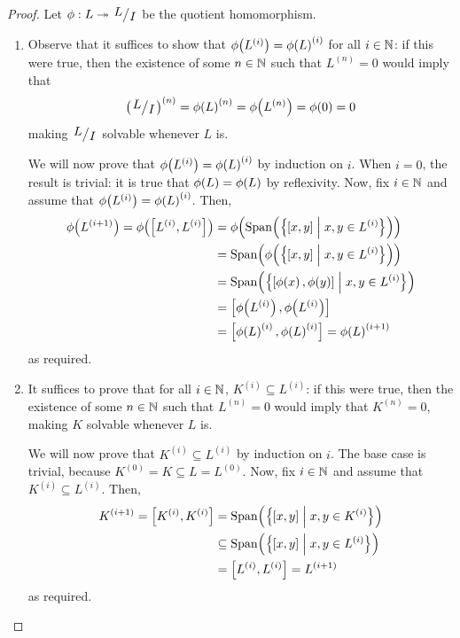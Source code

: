 \begin{proof}
    Let $\phi : L \surj \quotient{L}{I}$ be the quotient homomorphism.
    \begin{enumerate}
        \item Observe that it suffices to show that $\phi\!\left( L^{(i)} \right) = \phi\!\left( L \right)^{(i)}$ for all $i \in \mathbb{N}$: if this were true, then the existence of some $n \in \mathbb{N}$ such that $L^{(n)} = 0$ would imply that
        \begin{align*}
            \parenth{\quotient{L}{I}}^{(n)} = \phiof{L}^{(n)} = \phiof{L^{(n)}} = \phiof{0} = 0
        \end{align*}
        making $\quotient{L}{I}$ solvable whenever $L$ is.
        
        We will now prove that $\phi\!\left( L^{(i)} \right) = \phi\!\left( L \right)^{(i)}$ by induction on $i$. When $i = 0$, the result is trivial: it is true that $\phi\!\left( L \right) = \phi\!\left( L \right)$ by reflexivity. %
        Now, fix $i \in \mathbb{N}$ and assume that $\phi\!\left( L^{(i)} \right) = \phi\!\left( L \right)^{(i)}$. Then,
        \begin{align*}
            \phiof{L^{(i + 1)}} = \phiof{\brac{L^{(i)}, L^{(i)}}}
            &= \phiof{\Span{\setst{\brac{x,y}}{x, y \in L^{(i)}}}} \\
            &= \Span{\phiof{\setst{\brac{x,y}}{x, y \in L^{(i)}}}} \\
            &= \Span{\setst{\brac{\phiof{x}, \phiof{y}}}{x, y \in L^{(i)}}} \\
            &= \brac{\phiof{L^{(i)}}, \phiof{L^{(i)}}} \\
            &= \brac{\phiof{L}^{(i)}, \phiof{L}^{(i)}} = \phiof{L}^{(i + 1)}
        \end{align*}
        as required.

        \item It suffices to prove that for all $i \in \mathbb{N}$, $K^{(i)} \subseteq L^{(i)}$: if this were true, then the existence of some $n \in \mathbb{N}$ such that $L^{(n)} = 0$ would imply that $K^{(n)} = 0$, making $K$ solvable whenever $L$ is.
        
        We will now prove that $K^{(i)} \subseteq L^{(i)}$ by induction on $i$. The base case is trivial, because $K^{(0)} = K \subseteq L = L^{(0)}$. Now, fix $i \in \mathbb{N}$ and assume that $K^{(i)} \subseteq L^{(i)}$. Then,
        \begin{align*}
            K^{(i + 1)} = \left[ K^{(i)}, K^{(i)} \right]
            &= \operatorname{Span}\!\left( \left\{ \left[ x,y \right] \; \middle\vert \; x, y \in K^{(i)} \right\} \right) \\
            &\subseteq \operatorname{Span}\!\left( \left\{ \left[ x,y \right] \; \middle\vert \; x, y \in L^{(i)} \right\} \right) \\
            &= \left[ L^{(i)}, L^{(i)} \right] = L^{(i + 1)}
        \end{align*}
        as required.


\end{enumerate}
\end{proof}
